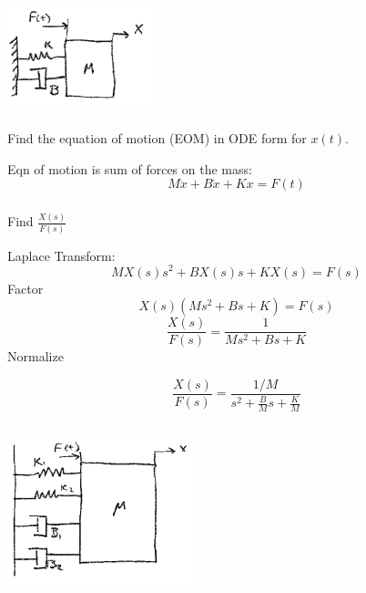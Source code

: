 \documentclass{article}	%
\begin{document}
\subsection{}

\includegraphics[width=42mm]{00449a.png}

\subsubsection{} Find the equation of motion (EOM) in ODE form for $x(t)$.

\begin{solution}
Eqn of motion is sum of forces on the mass:
\[
M\ddot{x} + B\dot{x} + Kx = F(t)
\]
\end{solution}

\subsubsection{} Find $\frac{X(s)}{F(s)}$

\begin{solution}
Laplace Transform:
\[
MX(s)s^2+BX(s)s+KX(s) = F(s)
\]
Factor
\[
X(s)\left( Ms^2+Bs+K \right ) = F(s)
\]
\[
\frac{X(s)}{F(s)} = \frac {1}  { Ms^2+Bs+K }
\]
Normalize

\[
\frac{X(s)}{F(s)} = \frac {1/M}  { s^2+\frac{B}{M}s+\frac{K}{M} }
\]

\end{solution}


\subsection{}
\includegraphics[width=54mm]{00450a.png}
\end{document}
